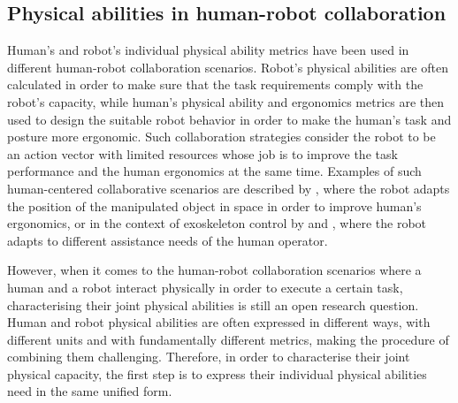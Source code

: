     

\subsection{Physical abilities in human-robot collaboration}

Human's and robot's individual physical ability metrics have been used in different human-robot collaboration scenarios. Robot's physical abilities are often calculated in order to make sure that the task requirements comply with the robot's capacity, while human's physical ability and ergonomics metrics are then used to design the suitable robot behavior in order to make the human's task and posture more ergonomic. Such collaboration strategies consider the robot to be an action vector with limited resources whose job is to improve the task performance and the human ergonomics at the same time. Examples of such human-centered collaborative scenarios are described by \citet{KIM2021102084}, where the robot adapts the position of the manipulated object in space in order to improve human's ergonomics, or in the context of exoskeleton control by \citet{carmichael2013admittance,carmichael_towards_2011} and \citet{petric2019assistive}, where the robot adapts to different assistance needs of the human operator.

However, when it comes to the human-robot collaboration scenarios where a human and a robot interact physically in order to execute a certain task, characterising their joint physical abilities is still an open research question. Human and robot physical abilities are often expressed in different ways, with different units and with fundamentally different metrics, making the procedure of combining them challenging. Therefore, in order to characterise their joint physical capacity, the first step is to express their individual physical abilities need in the same unified form. 

